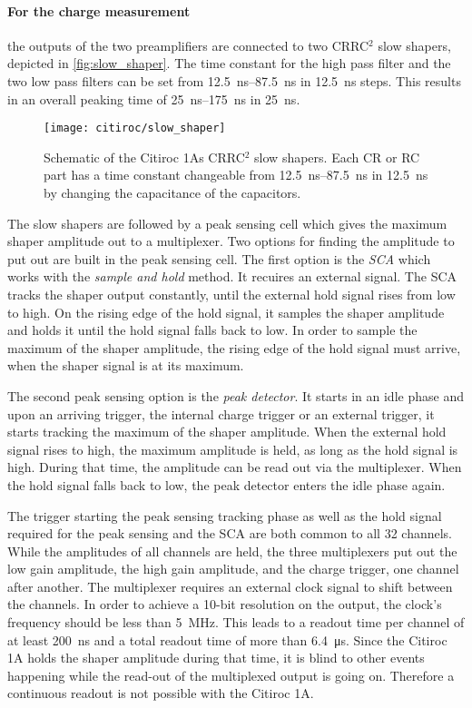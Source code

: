 \paragraph{For the charge measurement} the outputs of the two preamplifiers are connected to two CRRC$^2$ slow shapers, depicted in \autoref{fig:slow_shaper}.
The time constant for the high pass filter and the two low pass filters can be set from \SIrange{12.5}{87.5}{\nano\second} in \SI{12.5}{\nano\second} steps.
This results in an overall peaking time of \SIrange{25}{175}{\nano\second} in \SI{25}{\nano\second}.
\begin{figure}
	\centering
	\texttt{[image: citiroc/slow\_shaper]}
	\caption[Citiroc 1A slow shaper schematic]{Schematic of the Citiroc 1As CRRC$^2$ slow shapers. Each CR or RC part has a time constant changeable from \SIrange{12.5}{87.5}{\nano\second} in \SI{12.5}{\nano\second} by changing the capacitance of the capacitors. \cite{citiroc}}
	\label{fig:slow_shaper}
\end{figure}
The slow shapers are followed by a peak sensing cell which gives the maximum shaper amplitude out to a multiplexer.
Two options for finding the amplitude to put out are built in the peak sensing cell.
The first option is the \textit{SCA} which works with the \textit{sample and hold} method.
It recuires an external  signal.
The SCA tracks the shaper output constantly, until the external hold signal rises from low to high.
On the rising edge of the hold signal, it samples the shaper amplitude and holds it until the hold signal falls back to low.
In order to sample the maximum of the shaper amplitude, the rising edge of the hold signal must arrive, when the shaper signal is at its maximum. 


The second peak sensing option is the \textit{peak detector}.
It starts in an idle phase and upon an arriving trigger, the internal charge trigger or an external trigger, it starts tracking the maximum of the shaper amplitude.
When the external hold signal rises to high, the maximum amplitude is held, as long as the hold signal is high.
During that time, the amplitude can be read out via the multiplexer.
When the hold signal falls back to low, the peak detector enters the idle phase again.

The trigger starting the peak sensing tracking phase as well as the hold signal required for the peak sensing and the SCA are both common to all 32 channels.
While the amplitudes of all channels are held, the three multiplexers put out the low gain amplitude, the high gain amplitude, and the charge trigger, one channel after another.
The multiplexer requires an external clock signal to shift between the channels. 
In order to achieve a 10-bit resolution on the output, the clock's frequency should be less than \SI{5}{\mega\hertz}.
This leads to a readout time per channel of at least \SI{200}{\nano\second} and a total readout time of more than \SI{6.4}{\micro\second}.
Since the Citiroc 1A holds the shaper amplitude during that time, it is blind to other events happening while the read-out of the multiplexed output is going on.
Therefore a continuous readout is not possible with the Citiroc 1A.


